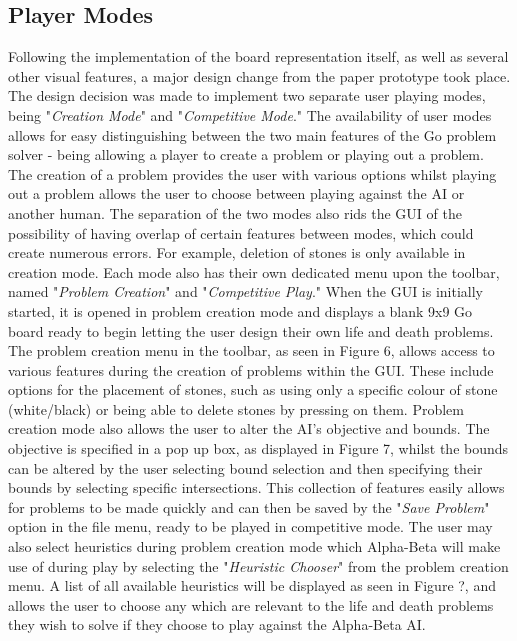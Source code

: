 \documentclass{l3proj}
\begin{document}
\subsection{Player Modes}

Following the implementation of the board representation itself, as well as several other visual features, a major design change from the paper prototype took place. The design decision was made to implement two separate user playing modes, being "\textit{Creation Mode}" and "\textit{Competitive Mode}." The availability of user modes allows for easy distinguishing between the two main features of the Go problem solver - being allowing a player to create a problem or playing out a problem. The creation of a problem provides the user with various options whilst playing out a problem allows the user to choose between playing against the AI or another human. The separation of the two modes also rids the GUI of the possibility of having overlap of certain features between modes, which could create numerous errors. For example, deletion of stones is only available in creation mode. Each mode also has their own dedicated menu upon the toolbar, named "\textit{Problem Creation}" and "\textit{Competitive Play}."
When the GUI is initially started, it is opened in problem creation mode and displays a blank 9x9 Go board ready to begin letting the user design their own life and death problems. The problem creation menu in the toolbar, as seen in Figure 6, allows access to various features during the creation of problems within the GUI. These include options for the placement of stones, such as using only a specific colour of stone (white/black) or being able to delete stones by pressing on them. Problem creation mode also allows the user to alter the AI's objective and bounds. The objective is specified in a pop up box, as displayed in Figure 7, whilst the bounds can be altered by the user selecting bound selection and then specifying their bounds by selecting specific intersections. This collection of features easily allows for problems to be made quickly and can then be saved by the "\textit{Save Problem}" option in the file menu, ready to be played in competitive mode. The user may also select heuristics during problem creation mode which Alpha-Beta will make use of during play by selecting the "\textit{Heuristic Chooser}" from the problem creation menu. A list of all available heuristics will be displayed as seen in Figure ?, and allows the user to choose any which are relevant to the life and death problems they wish to solve if they choose to play against the Alpha-Beta AI.
\end{document}
